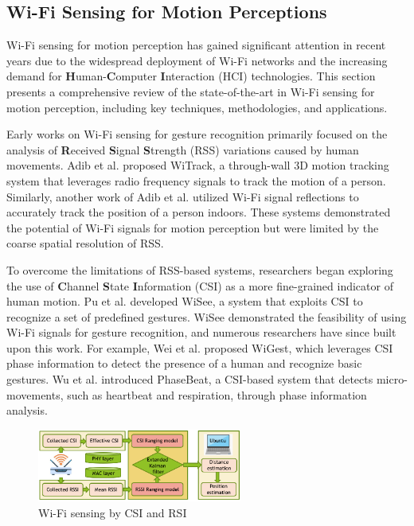 \documentclass[12pt, a4paper]{article}
\begin{document}
\subsection{Wi-Fi Sensing for Motion Perceptions}
Wi-Fi sensing for motion perception has gained significant attention in recent years due to the widespread deployment of Wi-Fi networks and the increasing demand for \textbf{H}uman-\textbf{C}omputer \textbf{I}nteraction (HCI) technologies. This section presents a comprehensive review of the state-of-the-art in Wi-Fi sensing for motion perception, including key techniques, methodologies, and applications.

Early works on Wi-Fi sensing for gesture recognition primarily focused on the analysis of \textbf{R}eceived \textbf{S}ignal \textbf{S}trength (RSS) variations caused by human movements. Adib et al. \cite{adib20143d} proposed WiTrack, a through-wall 3D motion tracking system that leverages radio frequency signals to track the motion of a person. Similarly, another work of Adib et al. \cite{adib2013see} utilized Wi-Fi signal reflections to accurately track the position of a person indoors. These systems demonstrated the potential of Wi-Fi signals for motion perception but were limited by the coarse spatial resolution of RSS.

To overcome the limitations of RSS-based systems, researchers began exploring the use of \textbf{C}hannel \textbf{S}tate \textbf{I}nformation (CSI) as a more fine-grained indicator of human motion. Pu et al. \cite{pu2013whole} developed WiSee, a system that exploits CSI to recognize a set of predefined gestures. WiSee demonstrated the feasibility of using Wi-Fi signals for gesture recognition, and numerous researchers have since built upon this work. For example, Wei et al. \cite{abdelnasser2015wigest} proposed WiGest, which leverages CSI phase information to detect the presence of a human and recognize basic gestures. Wu et al. \cite{wang2017phasebeat} introduced PhaseBeat, a CSI-based system that detects micro-movements, such as heartbeat and respiration, through phase information analysis.

\begin{figure}[ht!]
    \centering
    \includegraphics[width=0.6\textwidth]{image/wifi_csi_rsi.png}
    \caption{Wi-Fi sensing by CSI and RSI}
    \label{fig:wifi_csi_rsi}
\end{figure}
\end{document}
